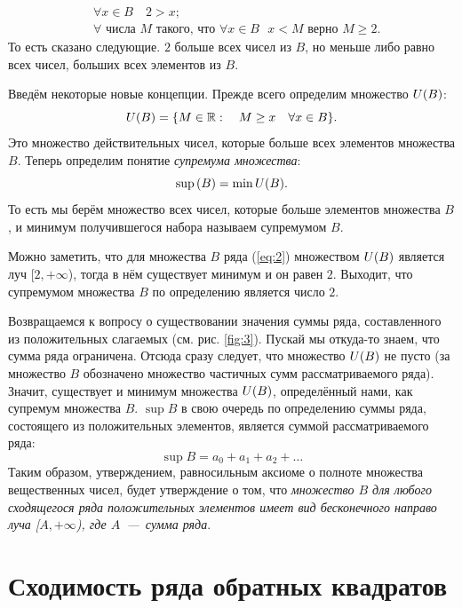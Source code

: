 \documentclass[12pt]{article}
\begin{document}
\begin{equation}
    \begin{split}
        &\forall x \in B \quad 2>x;\\
        &\forall \text{ числа $M$ такого, что } \forall x \in B\text{ } x<M \text{ верно } M \ge 2.
    \end{split}
\end{equation}
То есть сказано следующие. $2$ больше всех чисел из $B$, но меньше либо равно всех чисел, больших всех элементов из $B$.
\par
Введём некоторые новые концепции. Прежде всего определим множество $U\qty(B)$:
\begin{equation}
    U\qty(B) = \qty{M \in \mathbb{R}:\quad M \ge x \quad \forall x\in B}.
\end{equation}
Это множество действительных чисел, которые больше всех элементов множества $B$. Теперь определим понятие \emph{супремума множества}:
\begin{equation}
    \sup\qty(B) = \min U\qty(B).
\end{equation}
То есть мы берём множество всех чисел, которые больше элементов множества $B$, и минимум получившегося набора называем супремумом $B$.
\par
Можно заметить, что для множества $B$ ряда (\ref{eq:2}) множеством $U\qty(B)$ является луч [$2,+\infty$), тогда в нём существует минимум и он равен $2$. Выходит, что супремумом множества $B$ по определению является число $2$.
\par
Возвращаемся к вопросу о существовании значения суммы ряда, составленного из положительных слагаемых (см. рис. \ref{fig:3}). Пускай мы откуда\--то знаем, что сумма ряда ограничена. Отсюда сразу следует, что множество $U\qty(B)$ не пусто (за множество $B$ обозначено множество частичных сумм рассматриваемого ряда). Значит, существует и минимум множества $U\qty(B)$, определённый нами, как супремум множества $B$. $\sup B$ в свою очередь по определению суммы ряда, состоящего из положительных элементов, является суммой рассматриваемого ряда:
\begin{equation}
    \sup B = a_0 + a_1 + a_2 + \ldots
\end{equation}
Таким образом, утверждением, равносильным аксиоме о полноте множества вещественных чисел, будет утверждение о том, что \emph{множество $B$ для любого сходящегося ряда положительных элементов имеет вид бесконечного направо луча [$A,+\infty$), где $A$~\----~сумма ряда}.
\section{Сходимость ряда обратных квадратов}
\end{document}
